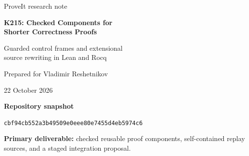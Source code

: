 \documentclass[11pt,letterpaper]{article}
\theoremstyle{definition}
\newcommand{\code}[1]{\texttt{\detokenize{#1}}}
\begin{document}
\hypersetup{pageanchor=false}
\begin{titlepage}
\vspace*{0.2in}
{\Large\color{ink} ProveIt research note\par}
\vspace{0.25in}
{\huge\bfseries K215: Checked Components for\\[5pt] Shorter Correctness Proofs\par}
\vspace{0.18in}
{\Large Guarded control frames and extensional\\source rewriting in Lean and Rocq\par}
\vspace{0.3in}
{\large Prepared for Vladimir Reshetnikov\par}
22 October 2026
\vspace{0.3in}
\begin{abstract}
The accepted 215-state binary Turing machine already has substantial proof
simplifications. The next useful step is to prove reusable statements about
unchanged context, then instantiate them at repeated occurrences. This note
turns two existing research proposals into checked components.

In Lean 4.32.0, we prove a guarded append-left frame rule for the maintained
symbolic executor, check all 35 proposed control templates, and derive complete
whole-tape and source-action contracts for every template. An independent audit
binds those templates to 1,422 control occurrences of the exact current source.
The proposed mixed proof has 4,789 expensive replay obligations instead of
6,176, while retaining all 6,176 source-outcome bindings. This is an obligation
count, not a measured endpoint speedup or a completed replacement endpoint.
An independent Rocq port checks the same 35 local replays and their framed
reachability; its Home and source-action adapters remain integration work.

For the Rocq source proof, we introduce pointwise register transport, avoiding
functional extensionality, and prove that reversing exactly shared nodes 188
and 190 of \code{dagPerm} preserves all structured exits and iterated halting.
These components are checked with Coq 8.18.0 and recursive \code{coqchk}; the
production Rocq 9.1.0 endpoint is a separate integration target.

The report gives mathematical proofs, exact integration obligations, failure
examples for unsafe simplifications, provenance, and further research
questions. It does not change the literal machine, claim an unconditional
consistency result, or claim a fresh build of either full endpoint.
\end{abstract}
\vfill
\textbf{Repository snapshot}\par
\small\nolinkurl{cbf94cb552a3b49509e0eee80e7455d4eb5974c6}\par
\normalsize\textbf{Primary deliverable:} checked reusable proof components,
self-contained replay sources, and a staged integration proposal.
\end{titlepage}
\hypersetup{pageanchor=true}
\end{document}
